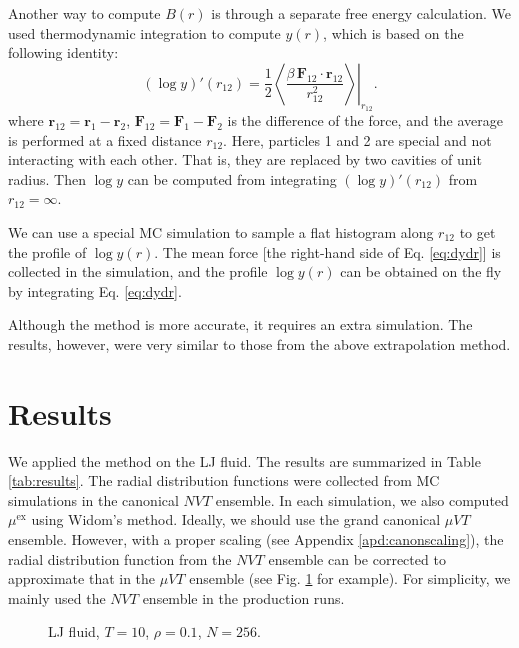 \documentclass[preprint]{revtex4-1}
\newcommand{\vct}[1]{\mathbf{#1}}
\providecommand{\vr}{} %
\renewcommand{\vr}{\vct{r}}
\newcommand{\supex}[1]{ { { #1 }^{ \mathrm{ex} } } }
\newcommand{\muex}{\supex{\mu}}
\begin{document}
Another way to compute $B(r)$ is through a separate free energy calculation.
%
We used thermodynamic integration to compute $y(r)$,
which is based on the following identity:
\begin{equation}
  (\log y)'(r_{12})
=
  \frac{1}{2}
  \left.
    \left\langle
      \frac{ \beta \, \vct F_{12} \cdot \vr_{12} }
           { r^2_{12} }
    \right\rangle
  \right|_{r_{12}}.
  \label{eq:dydr}
\end{equation}
where
$\vr_{12} = \vr_1 - \vr_2$,
$\vct F_{12} = \vct F_1 - \vct F_2$ is the difference of the force,
and the average is performed at a fixed distance $r_{12}$.
%
Here, particles 1 and 2 are special and not interacting with each other.
That is, they are replaced by two cavities of unit radius.
%
Then $\log y$ can be computed from integrating $(\log y)'(r_{12})$ from $r_{12} = \infty$.

We can use a special MC simulation to sample a flat histogram along $r_{12}$
to get the profile of $\log y(r)$.
%
The mean force [the right-hand side of Eq. \eqref{eq:dydr}]
is collected in the simulation,
and the profile $\log y(r)$
can be obtained on the fly
by integrating Eq. \eqref{eq:dydr}.



Although the method is more accurate, it requires an extra simulation.
%
The results, however, were very similar to those from the above extrapolation method.





\section{Results}

We applied the method on the LJ fluid.
%
The results are summarized in Table \ref{tab:results}.
%
%
The radial distribution functions
were collected from MC simulations in the canonical $NVT$ ensemble.
%
In each simulation,
we also computed $\muex$ using Widom's method.
%
Ideally, we should use the grand canonical $\mu VT$ ensemble.
%
However, with a proper scaling (see Appendix \ref{apd:canonscaling}),
the radial distribution function from the $NVT$ ensemble can be corrected to approximate
that in the $\mu VT$ ensemble (see Fig. \ref{fig:rdfscale} for example).
%
For simplicity, we mainly used the $NVT$ ensemble in the production runs.

\begin{figure}[h]
  \caption{
    \label{fig:rdfscale}
    LJ fluid, $T = 10$, $\rho = 0.1$, $N = 256$.
  }
\end{figure}
\end{document}
